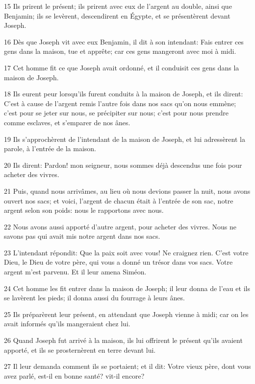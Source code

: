 \par 15 Ils prirent le présent; ils prirent avec eux de l'argent au double, ainsi que Benjamin; ils se levèrent, descendirent en Égypte, et se présentèrent devant Joseph.
\par 16 Dès que Joseph vit avec eux Benjamin, il dit à son intendant: Fais entrer ces gens dans la maison, tue et apprête; car ces gens mangeront avec moi à midi.
\par 17 Cet homme fit ce que Joseph avait ordonné, et il conduisit ces gens dans la maison de Joseph.
\par 18 Ils eurent peur lorsqu'ils furent conduits à la maison de Joseph, et ils dirent: C'est à cause de l'argent remis l'autre fois dans nos sacs qu'on nous emmène; c'est pour se jeter sur nous, se précipiter sur nous; c'est pour nous prendre comme esclaves, et s'emparer de nos ânes.
\par 19 Ils s'approchèrent de l'intendant de la maison de Joseph, et lui adressèrent la parole, à l'entrée de la maison.
\par 20 Ils dirent: Pardon! mon seigneur, nous sommes déjà descendus une fois pour acheter des vivres.
\par 21 Puis, quand nous arrivâmes, au lieu où nous devions passer la nuit, nous avons ouvert nos sacs; et voici, l'argent de chacun était à l'entrée de son sac, notre argent selon son poids: nous le rapportons avec nous.
\par 22 Nous avons aussi apporté d'autre argent, pour acheter des vivres. Nous ne savons pas qui avait mis notre argent dans nos sacs.
\par 23 L'intendant répondit: Que la paix soit avec vous! Ne craignez rien. C'est votre Dieu, le Dieu de votre père, qui vous a donné un trésor dans vos sacs. Votre argent m'est parvenu. Et il leur amena Siméon.
\par 24 Cet homme les fit entrer dans la maison de Joseph; il leur donna de l'eau et ils se lavèrent les pieds; il donna aussi du fourrage à leurs ânes.
\par 25 Ils préparèrent leur présent, en attendant que Joseph vienne à midi; car on les avait informés qu'ils mangeraient chez lui.
\par 26 Quand Joseph fut arrivé à la maison, ils lui offrirent le présent qu'ils avaient apporté, et ils se prosternèrent en terre devant lui.
\par 27 Il leur demanda comment ils se portaient; et il dit: Votre vieux père, dont vous avez parlé, est-il en bonne santé? vit-il encore?
